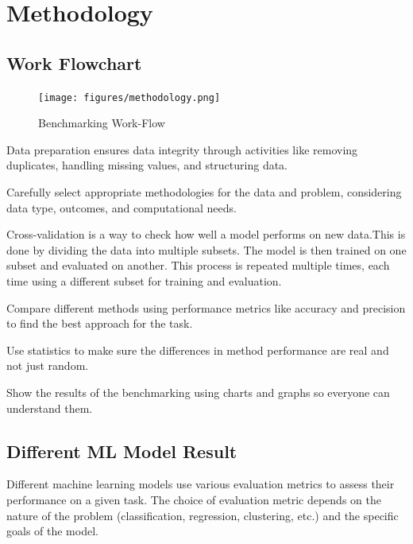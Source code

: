 \chapter{Methodology}





\section{Work Flowchart }

\begin{figure}[!h]
    \centering
    \texttt{[image: figures/methodology.png]}
    \caption{Benchmarking Work-Flow}
   
    \label{fig:Benchmarking Work-Flow}
\end{figure}

\vspace{1cm}

Data preparation ensures data integrity through activities like removing duplicates, handling missing values, and structuring data.

Carefully select appropriate methodologies for the data and problem, considering data type, outcomes, and computational needs.

Cross-validation is a way to check how well a model performs on new data.This is done by dividing the data into multiple subsets. The model is then trained on one subset and evaluated on another. This process is repeated multiple times, each time using a different subset for training and evaluation.

Compare different methods using performance metrics like accuracy and precision to find the best approach for the task.

Use statistics to make sure the differences in method performance are real and not just random.

Show the results of the benchmarking using charts and graphs so everyone can understand them.


\section{Different ML Model Result}


Different machine learning models use various evaluation metrics to assess their performance on a given task. The choice of evaluation metric depends on the nature of the problem (classification, regression, clustering, etc.) and the specific goals of the model. 

